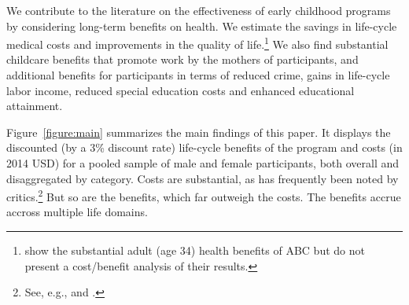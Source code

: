 We contribute to the literature on the effectiveness of early childhood programs by considering long-term benefits on health. We estimate the savings in life-cycle medical costs and improvements in the quality of life.\footnote{\cite{Campbell_Conti_etal_2014_EarlyChildhoodInvestments} show the substantial adult (age 34) health benefits of ABC but do not present a cost/benefit analysis of their results.} We also find substantial childcare benefits that promote work by the mothers of participants, and additional benefits for participants in terms of reduced crime, gains in life-cycle labor income, reduced special education costs and enhanced educational attainment.

Figure~\ref{figure:main} summarizes the main findings of this paper. It displays the discounted (by a 3\% discount rate) life-cycle benefits of the program and costs (in 2014 USD) for a pooled sample of male and female participants, both overall and disaggregated by category. Costs are substantial, as has frequently been noted by critics.\footnote{See, e.g., \citet{Whitehurst_2014_Senate_Testimony} and \citet{Fox_News_2014_Head_Start_Effects}.} But so are the benefits, which far outweigh the costs. The benefits accrue accross multiple life domains.

